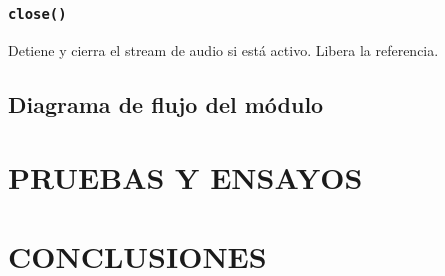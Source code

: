 \subsubsection*{\texttt{close()}}

Detiene y cierra el stream de audio si está activo. Libera la referencia.

\subsection{Diagrama de flujo del módulo}




\clearpage
\section{PRUEBAS Y ENSAYOS}

\clearpage
\section{CONCLUSIONES}

%